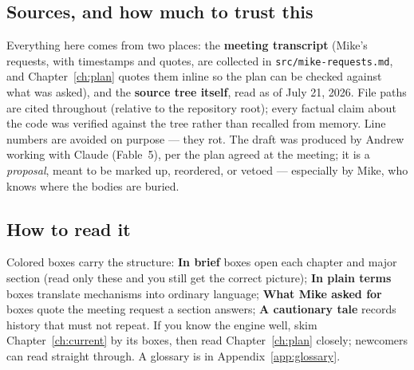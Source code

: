 \documentclass[11pt,oneside]{report}
\newcommand{\file}[1]{\textcolor{m2file}{\texttt{#1}}}
\begin{document}
\subsection*{Sources, and how much to trust this}

Everything here comes from two places: the \textbf{meeting transcript}
(Mike's requests, with timestamps and quotes, are collected in
\file{src/mike-requests.md}, and Chapter~\ref{ch:plan} quotes them inline so
the plan can be checked against what was asked), and the \textbf{source tree
itself}, read as of July 21, 2026. File paths are cited throughout (relative
to the repository root); every factual claim about the code was verified
against the tree rather than recalled from memory. Line numbers are avoided
on purpose --- they rot. The draft was produced by Andrew working with
Claude (Fable~5), per the plan agreed at the meeting; it is a
\emph{proposal}, meant to be marked up, reordered, or vetoed --- especially
by Mike, who knows where the bodies are buried.

\subsection*{How to read it}

Colored boxes carry the structure: \textbf{In brief} boxes open each chapter
and major section (read only these and you still get the correct picture);
\textbf{In plain terms} boxes translate mechanisms into ordinary language;
\textbf{What Mike asked for} boxes quote the meeting request a section
answers; \textbf{A cautionary tale} records history that must not repeat.
If you know the engine well, skim Chapter~\ref{ch:current} by its boxes,
then read Chapter~\ref{ch:plan} closely; newcomers can read straight
through. A glossary is in Appendix~\ref{app:glossary}.

\setcounter{tocdepth}{1}
\tableofcontents

\end{document}
